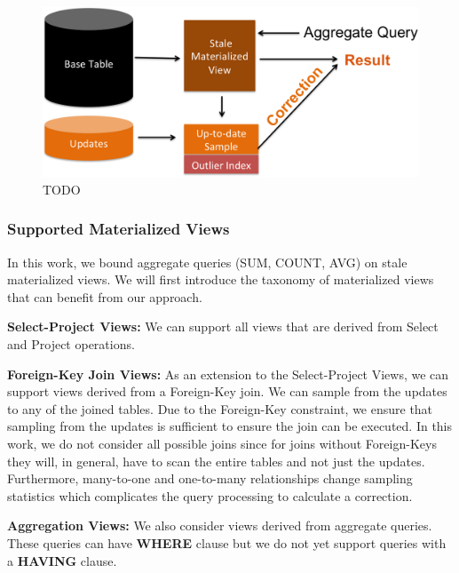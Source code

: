 \begin{figure}[h]
\label{sys-arch}
\centering
 \includegraphics[width=\columnwidth]{figs/sys-arch.png}
 \caption{TODO}
\end{figure}

\subsubsection{Supported Materialized Views}\label{subsubsec:supported-view}
In this work, we bound aggregate queries (SUM, COUNT, AVG) on stale materialized views.
We will first introduce the taxonomy of materialized views
that can benefit from our approach. 
\vspace{1em}

\noindent\textbf{Select-Project Views: } We can support all views that are derived from Select and Project operations. 

\vspace{1em}

\noindent\textbf{Foreign-Key Join Views: } As an extension to the Select-Project Views, we can support views derived from a Foreign-Key join. We can sample from the updates to any of the joined tables. Due to the Foreign-Key constraint, we ensure that sampling from the updates is sufficient to ensure the join can be executed. In this work, we do not consider all possible joins since for joins without Foreign-Keys they will, in general, have to scan the entire tables and not just the updates. Furthermore, many-to-one and one-to-many relationships change sampling statistics which complicates the query processing to calculate a correction.

\vspace{1em}

\noindent\textbf{Aggregation Views: } We also consider views derived from aggregate queries. These queries can have \textbf{WHERE} clause but we do not yet support queries with a \textbf{HAVING} clause.

